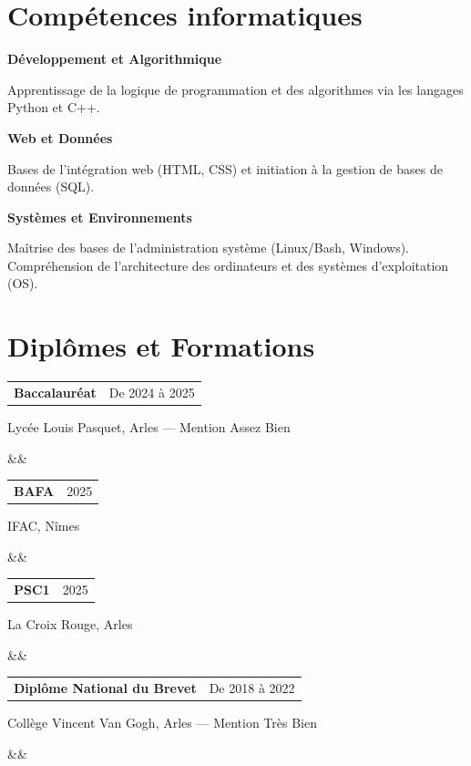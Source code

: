\documentclass[11pt, a4paper]{article}
\makeatletter
\newcommand{\cventry}[4]{%
    \noindent\begin{tabular*}{\linewidth}{@{}l@{\extracolsep{\fill}}r@{}}
        \textbf{#1} & {\small\color{muted}#2}\\
    \end{tabular*}\par
    {\small\color{accent}#3}\par
    \ifx&#4&%
    \else
        \vspace{2pt}{\small\color{ink}#4}\par
    \fi
    \vspace{7pt}
}
\makeatother
\begin{document}
\begin{minipage}[t]{0.63\textwidth}

\section*{Compétences informatiques}
\textbf{Développement et Algorithmique}\par
{\small\color{muted}Apprentissage de la logique de programmation et des algorithmes via les langages Python et C++.\par}
\vspace{5pt}
\textbf{Web et Données}\par
{\small\color{muted}Bases de l'intégration web (HTML, CSS) et initiation à la gestion de bases de données (SQL).\par}
\vspace{5pt}
\textbf{Systèmes et Environnements}\par
{\small\color{muted}Maîtrise des bases de l'administration système (Linux/Bash, Windows). Compréhension de l'architecture des ordinateurs et des systèmes d'exploitation (OS).\par}

\section*{Diplômes et Formations}

\cventry{Baccalauréat}{De 2024 à 2025}{Lycée Louis Pasquet, Arles --- Mention Assez Bien}{}
\cventry{BAFA}{2025}{IFAC, Nîmes}{}
\cventry{PSC1}{2025}{La Croix Rouge, Arles}{}
\cventry{Diplôme National du Brevet}{De 2018 à 2022}{Collège Vincent Van Gogh, Arles --- Mention Très Bien}{}

\end{minipage}%
\hfill
\end{document}
